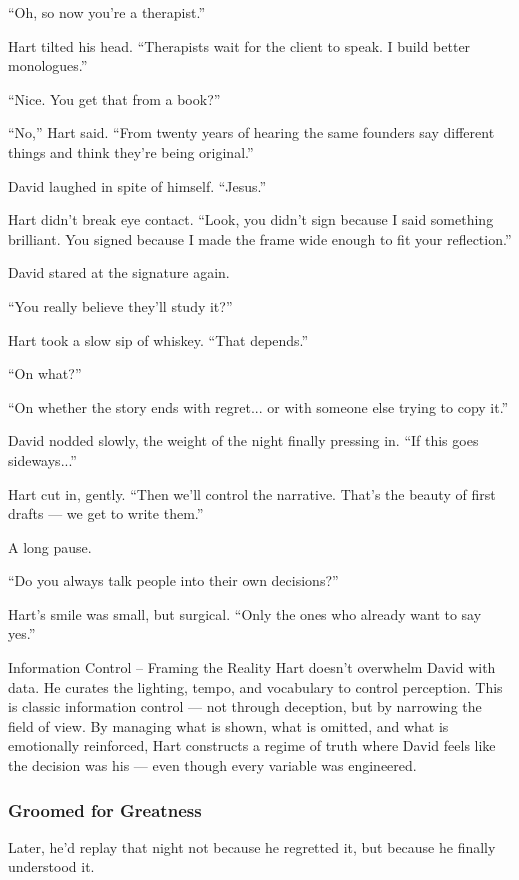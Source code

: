“Oh, so now you’re a therapist.”

Hart tilted his head. “Therapists wait for the client to speak. I build better monologues.”

“Nice. You get that from a book?”

“No,” Hart said. “From twenty years of hearing the same founders say different things and think they’re being original.”

David laughed in spite of himself. “Jesus.”

Hart didn’t break eye contact. “Look, you didn’t sign because I said something brilliant. You signed because I made the frame wide enough to fit your reflection.”


David stared at the signature again.

“You really believe they’ll study it?”

Hart took a slow sip of whiskey. “That depends.”

“On what?”

“On whether the story ends with regret... or with someone else trying to copy it.”

David nodded slowly, the weight of the night finally pressing in. “If this goes sideways...”

Hart cut in, gently. “Then we’ll control the narrative. That’s the beauty of first drafts — we get to write them.”

A long pause.

“Do you always talk people into their own decisions?”

Hart’s smile was small, but surgical. “Only the ones who already want to say yes.”

\begin{PsychologicalSidebar}{Information Control – Framing the Reality}
Hart doesn’t overwhelm David with data. He curates the lighting, tempo, and vocabulary to control perception.
This is classic information control — not through deception, but by narrowing the field of view.
By managing what is shown, what is omitted, and what is emotionally reinforced, Hart constructs a regime of truth
where David feels like the decision was his — even though every variable was engineered.
\end{PsychologicalSidebar}


\subsubsection{Groomed for Greatness}

Later, he’d replay that night not because he regretted it, but because he finally understood it.

